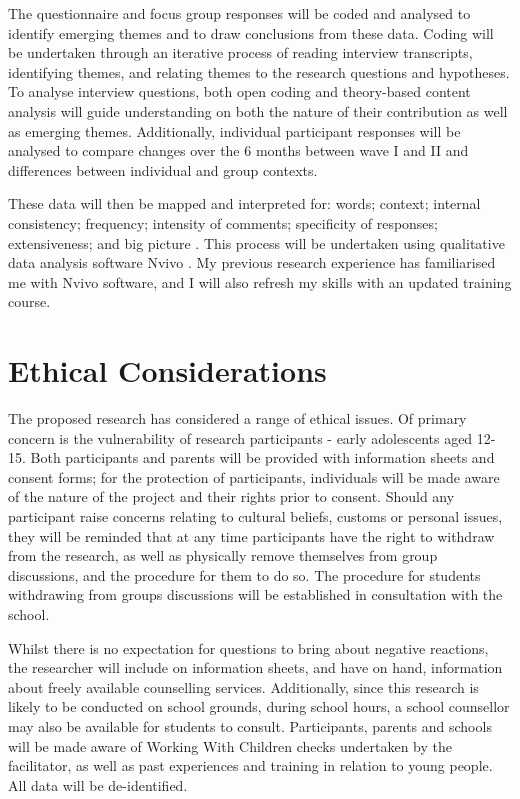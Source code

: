 The questionnaire and focus group responses will be coded and analysed to identify emerging themes and to draw conclusions from these data. Coding will be undertaken through an iterative process of reading interview transcripts, identifying themes, and relating themes to the research questions and hypotheses. To analyse interview questions, both open coding \citep{Strauss1998} and theory-based content analysis \citep{Stewart2009} will guide understanding on both the nature of their contribution as well as emerging themes. Additionally, individual participant responses will be analysed to compare changes over the 6 months between wave I and II and differences between individual and group contexts. 

These data will then be mapped and interpreted for: words; context; internal consistency; frequency; intensity of comments; specificity of responses; extensiveness; and big picture \citep{Rabiee2007}. This process will be undertaken using qualitative data analysis software Nvivo \citep{Stewart2009}. My previous research experience has familiarised me with Nvivo software, and I will also refresh my skills with an updated training course. 

\section{Ethical Considerations}
The proposed research has considered a range of ethical issues. Of primary concern is the vulnerability of research participants - early adolescents aged 12-15. Both participants and parents will be provided with information sheets and consent forms; for the protection of participants, individuals will be made aware of the nature of the project and their rights prior to consent. Should any participant raise concerns relating to cultural beliefs, customs or personal issues, they will be reminded that at any time participants have the right to withdraw from the research, as well as physically remove themselves from group discussions, and the procedure for them to do so. The procedure for students withdrawing from groups discussions will be established in consultation with the school. 

Whilst there is no expectation for questions to bring about negative reactions, the researcher will include on information sheets, and have on hand, information about freely available counselling services. Additionally, since this research is likely to be conducted on school grounds, during school hours, a school counsellor may also be available for students to consult. Participants, parents and schools will be made aware of Working With Children checks undertaken by the facilitator, as well as past experiences and training in relation to young people. All data will be de-identified. 



